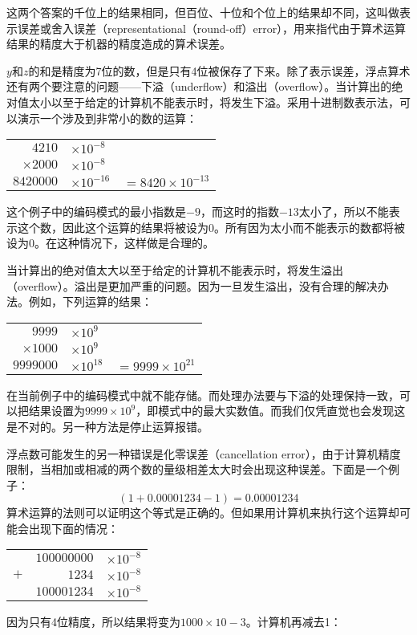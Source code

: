 这两个答案的千位上的结果相同，但百位、十位和个位上的结果却不同，这叫做表示误差或舍入误差（representational（round-off）error），用来指代由于算术运算结果的精度大于机器的精度造成的算术误差。

$y$和$z$的和是精度为7位的数，但是只有4位被保存了下来。除了表示误差，浮点算术还有两个要注意的问题——下溢（underflow）和溢出（overflow）。当计算出的绝对值太小以至于给定的计算机不能表示时，将发生下溢。采用十进制数表示法，可以演示一个涉及到非常小的数的运算：

\begin{table}[htbp]
\centering
\begin{tabular}{rll}
$4210$			& $\times 10^{-8}$		& \\
$\times 2000$	& $\times 10^{-8}$		& \\
\hline
$8420000$		& $\times 10^{-16}$	& $=8420\times 10^{-13}$	\\
\end{tabular}
\end{table}

这个例子中的编码模式的最小指数是$-9$，而这时的指数$-13$太小了，所以不能表示这个数，因此这个运算的结果将被设为0。所有因为太小而不能表示的数都将被设为0。在这种情况下，这样做是合理的。

当计算出的绝对值太大以至于给定的计算机不能表示时，将发生溢出（overflow）。溢出是更加严重的问题。因为一旦发生溢出，没有合理的解决办法。例如，下列运算的结果：


\begin{table}[htbp]
\centering
\begin{tabular}{rll}
$9999$			& $\times 10^{9}$		& \\
$\times 1000$	& $\times 10^{9}$		& \\
\hline
$9999000$		& $\times 10^{18}$		& $=9999\times 10^{21}$	\\
\end{tabular}
\end{table}

在当前例子中的编码模式中就不能存储。而处理办法要与下溢的处理保持一致，可以把结果设置为$9999\times 10^9$，即模式中的最大实数值。而我们仅凭直觉也会发现这是不对的。另一种方法是停止运算报错。

浮点数可能发生的另一种错误是化零误差（cancellation error），由于计算机精度限制，当相加或相减的两个数的量级相差太大时会出现这种误差。下面是一个例子：
\[(1+0.00001234-1)= 0.00001234\]
算术运算的法则可以证明这个等式是正确的。但如果用计算机来执行这个运算却可能会出现下面的情况：

\begin{table}[htbp]
\centering
\begin{tabular}{rrl}
	& $100000000$	& $\times 10^{-8}$	\\
$+$& $1234$			& $\times 10^{-8}$	\\
\hline
	& $100001234$	& $\times 10^{-8}$	\\
\end{tabular}
\end{table}
因为只有4位精度，所以结果将变为$1000×10-3$。计算机再减去1：

